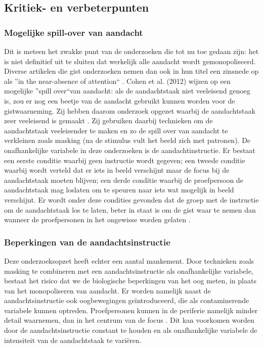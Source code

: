 \documentclass[a4paper,jou]{apa6}  %
\begin{document}
\subsection{Kritiek- en verbeterpunten}
\subsubsection{Mogelijke spill-over van aandacht} Dit is meteen het zwakke punt van de onderzoeken die tot nu toe gedaan zijn: het is niet definitief uit te sluiten dat werkelijk alle aandacht wordt gemonopoliseerd. Diverse artikelen die gist onderzoeken nemen dan ook in hun titel een zinsnede op als \textquotedblright in the near-absence of attention\textquotedblleft\; \cite{LiVanRullenKochPerona2002,Reddy_Reddy_Koch_2006}. Cohen et al. (2012) wijzen op een mogelijke \textquotedblright spill over\textquotedblleft\;van aandacht: als de aandachtstaak niet veeleisend genoeg is, zou er nog een beetje van de aandacht gebruikt kunnen worden voor de gistwaarneming. Zij hebben daarom onderzoek opgezet waarbij de aandachtstaak zeer veeleisend is gemaakt \cite{Mack_Clarke_2012,Cohen_Cavanagh_Chun_Nakayama_2012}. Zij gebruiken daarbij technieken om de aandachtstaak veeleisender te maken en zo de spill over van aandacht te verkleinen zoals masking (na de stimulus vult het beeld zich met patronen). De onafhankelijke variabele in deze onderzoeken is de aandachtinstructie. Er bestaat een eerste conditie waarbij geen instructie wordt gegeven; een tweede conditie waarbij wordt verteld dat er iets in beeld verschijnt maar de focus bij de aandachtstaak moeten blijven; een derde conditie waarbij de proefpersoon de aandachtstaak mag loslaten om te speuren naar iets wat mogelijk in beeld verschijnt. Er wordt onder deze condities gevonden dat de groep met de instructie om de aandachtstaak los te laten, beter in staat is om de gist waar te nemen dan wanneer de proefpersonen in het ongewisse worden gelaten \cite{Mack_Clarke_2012,Cohen_Cavanagh_Chun_Nakayama_2012}.
\subsubsection{Beperkingen van de aandachtsinstructie}
Deze onderzoeksopzet heeft echter een aantal mankement. Door technieken zoals masking te combineren met een aandachtsinstructie als onafhankelijke variabele, bestaat het risico dat we de biologische beperkingen van het oog meten, in plaats van het monopoliseren van aandacht. Er worden namelijk naast de aandachtsinstructie ook oogbewegingen ge\"introduceerd, die als contaminerende variabele kunnen optreden. Proefpersonen kunnen in de periferie namelijk minder detail waarnemen, dan in het centrum van de focus \cite{moore2013clinically}. Dit kan voorkomen worden door de aandachtsinstructie constant te houden en als onafhankelijke variabele de intensiteit van de aandachtstaak te vari\"eren.
\end{document}
